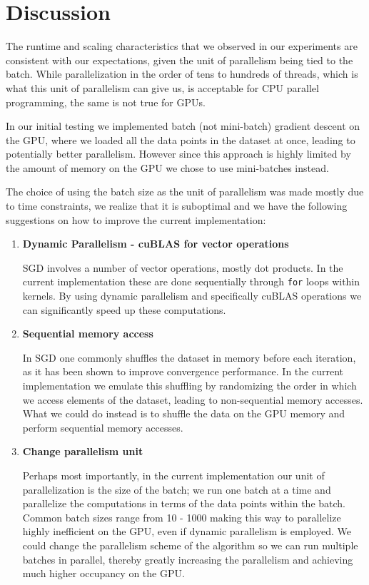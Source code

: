 \documentclass[11pt,a4paper]{article}
\begin{document}
\section{Discussion}

The runtime and scaling characteristics that we observed in our experiments are
consistent with our expectations, given the unit of parallelism being tied to the
batch. While parallelization in the order of tens to hundreds of threads, which
is what this unit of parallelism can give us, is acceptable for CPU parallel
programming, the same is not true for GPUs.

In our initial testing we implemented batch (not mini-batch) gradient descent
on the GPU, where we loaded all the data points in the dataset at once, leading
to potentially better parallelism. However since this approach is highly limited
by the amount of memory on the GPU we chose to use mini-batches instead.

The choice of using the batch size as the unit of parallelism was made mostly due to
time constraints, we realize that it is suboptimal and we have the following suggestions
on how to improve the current implementation:

\begin{enumerate}
	\item \textbf{Dynamic Parallelism - cuBLAS for vector operations}
	
	SGD involves a number of vector operations, mostly dot products.
	In the current implementation these are done sequentially through \texttt{for} loops within kernels.
	By using dynamic parallelism and specifically cuBLAS operations
	we can significantly speed up these computations.
	
	
	\item \textbf{Sequential memory access}
	
	In SGD one commonly shuffles the dataset in memory before each iteration, as it has been shown to improve
	convergence performance. In the current implementation we emulate this shuffling by randomizing the
	order in which we access elements of the dataset, leading to non-sequential memory 
	accesses. What we could do instead is to shuffle the data on the GPU memory and perform 
	sequential memory accesses.
	
	\item \textbf{Change parallelism unit}
	
	Perhaps most importantly, in the current implementation our unit of parallelization is the size of the batch; we run one batch 
	at a time and parallelize
	the computations in terms of the data points within the batch. Common batch sizes range from 10 - 1000
	making this way to parallelize highly inefficient on the GPU, even if dynamic parallelism is employed.
	We could change the parallelism scheme of the algorithm so we can run multiple
	batches in parallel, thereby greatly increasing the parallelism and achieving much 
	higher occupancy on the GPU.
\end{enumerate}
\end{document}
